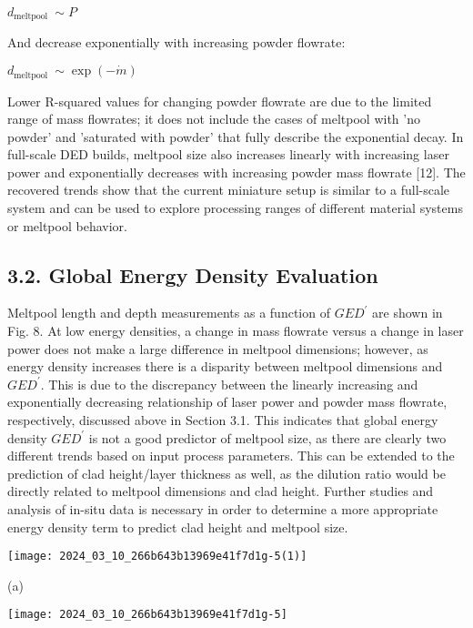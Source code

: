 \documentclass[10pt]{article}
\begin{document}
$d_{\text {meltpool }} \sim P$

And decrease exponentially with increasing powder flowrate:

$d_{\text {meltpool }} \sim \exp (-\dot{m})$

Lower R-squared values for changing powder flowrate are due to the limited range of mass flowrates; it does not include the cases of meltpool with 'no powder' and 'saturated with powder' that fully describe the exponential decay. In full-scale DED builds, meltpool size also increases linearly with increasing laser power and exponentially decreases with increasing powder mass flowrate [12]. The recovered trends show that the current miniature setup is similar to a full-scale system and can be used to explore processing ranges of different material systems or meltpool behavior.

\subsection*{3.2. Global Energy Density Evaluation}
Meltpool length and depth measurements as a function of $G E D^{\prime}$ are shown in Fig. 8. At low energy densities, a change in mass flowrate versus a change in laser power does not make a large difference in meltpool dimensions; however, as energy density increases there is a disparity between meltpool dimensions and $G E D^{\prime}$. This is due to the discrepancy between the linearly increasing and exponentially decreasing relationship of laser power and powder mass flowrate, respectively, discussed above in Section 3.1. This indicates that global energy density $G E D^{\prime}$ is not a good predictor of meltpool size, as there are clearly two different trends based on input process parameters. This can be extended to the prediction of clad height/layer thickness as well, as the dilution ratio would be directly related to meltpool dimensions and clad height. Further studies and analysis of in-situ data is necessary in order to determine a more appropriate energy density term to predict clad height and meltpool size.

\begin{center}
\texttt{[image: 2024\_03\_10\_266b643b13969e41f7d1g-5(1)]}
\end{center}

(a)

\begin{center}
\texttt{[image: 2024\_03\_10\_266b643b13969e41f7d1g-5]}
\end{center}
\end{document}
